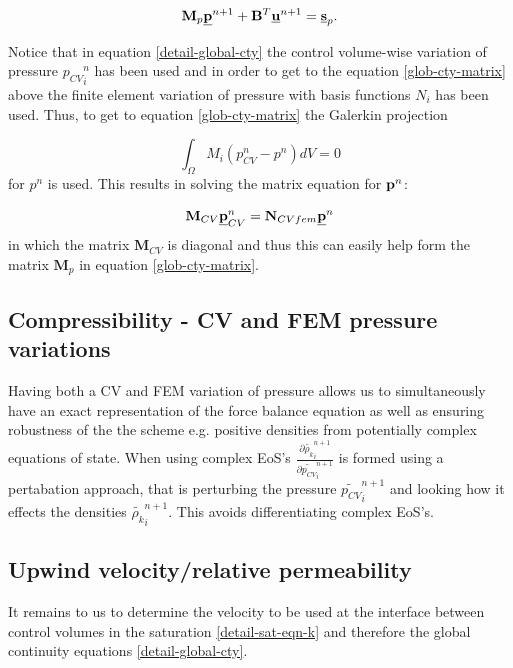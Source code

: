 \begin{equation}
{\mathbf M}_p \underline{\bf p}^{n+1} + {\mathbf B}^T \underline{\bf u}^{n+1}
= \underline{\bf s}_p.
\label{glob-cty-matrix}
\end{equation}

Notice that in equation \ref{detail-global-cty} the
control volume-wise variation of pressure ${p_{CV}}_i^n$ has been
used and in order to get to the equation  \ref{glob-cty-matrix}
above the finite element variation of pressure with basis
functions $N_i$ has been used. Thus, to get to equation
\ref{glob-cty-matrix} the Galerkin projection

\begin{equation}
\int_{\Omega} M_i (p_{CV}^n-p^n) dV =0
\end{equation}
for $p^n$ is used. This results in solving the matrix
equation for ${\bf p}^n$:

\begin{equation}
{\mathbf M}_{CV} \underline{\bf p}_{CV}^n = {\mathbf N}_{CVfem} \underline {\bf p}^n
\end{equation}
in which the matrix ${\mathbf M}_{CV}$ is diagonal and thus
this can easily help form the matrix ${\mathbf M}_p$ in equation
\ref{glob-cty-matrix}.

\subsection{Compressibility - CV and FEM pressure variations}

Having both a CV and FEM variation of pressure allows us to
simultaneously have an exact representation of the force balance
equation as well as ensuring robustness of the the scheme
e.g. positive densities from potentially complex equations
of state. When using complex EoS's $\frac{\partial \tilde { \rho_k}_i^{n+1}}{\partial \tilde {p_{CV}}_i^{n+1}}$ is formed
using a pertabation approach, that is
perturbing the pressure $\tilde {p_{CV}}_i^{n+1}$ and looking how
it effects the densities $\tilde {\rho_k}_i^{n+1}$. This
avoids differentiating complex EoS's.



\subsection{Upwind velocity/relative permeability}
\label{opt-up}

It remains to us to determine the velocity to be used
at the interface between control volumes in the
saturation \ref{detail-sat-eqn-k} and therefore
the global continuity equations \ref{detail-global-cty}.

